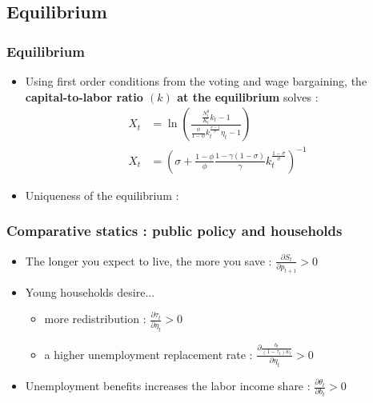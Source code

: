 \documentclass{beamer}
\begin{document}
		\subsection{Equilibrium}
			\begin{frame}[label = captolab]\frametitle{Equilibrium}
				\begin{itemize}
					\item Using first order conditions from the voting and wage bargaining, the \textbf{capital-to-labor ratio $(k)$ at the equilibrium} solves :
					\begin{align}
						X_t &= \ln\left( \frac{ \frac{N_t^y}{K_t} k_t - 1 } { \frac{\phi}{1-\phi} k_t^{\frac{\sigma-1}{\sigma}} \eta_t - 1 }\right) \label{eq:x1} \\
						X_t &= \left( \sigma + \frac{1-\phi}{\phi} \frac{1-\gamma(1-\sigma)}{\gamma} k_t^{\frac{1-\sigma}{\sigma}} \right)^{-1} \label{eq:x2}
					\end{align}
					\item Uniqueness of the equilibrium : \hyperlink{uniqueness<1>}{}
				\end{itemize}
			\end{frame}
			\begin{frame}\frametitle{Comparative statics : public policy and households}
				\begin{itemize}
					\item The longer you expect to live, the more you save : $\frac{\partial S_t}{\partial p_{t+1}} > 0$
					\vspace{1em}
					\item Young households desire...
					\begin{itemize}
						\item more redistribution : $\frac{\partial \tau_t}{\partial \eta_t} > 0$
						\item a higher unemployment replacement rate : $\frac{\partial \frac{b_t}{(1-\tau_t)w_t}}{\partial \eta_t}>0$
					\end{itemize}
					\vspace{1em}
					\item Unemployment benefits increases the labor income share : $\frac{\partial \theta_t}{\partial b_t} > 0$
				\end{itemize}
			\end{frame}
\end{document}
